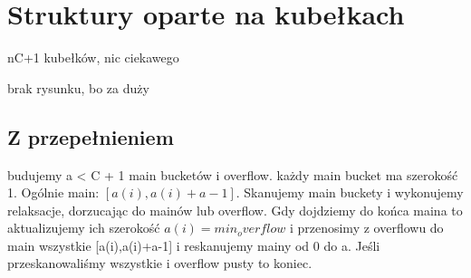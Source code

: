 \section{Struktury oparte na kubełkach}
\label{sec:dijkstraBuckets}

nC+1 kubełków, nic ciekawego

brak rysunku, bo za duży


\subsection{Z przepełnieniem}


budujemy a < C + 1 main bucketów i overflow. każdy main bucket ma szerokość 1. Ogólnie main: $[a(i),a(i)+a-1]$. Skanujemy main buckety i wykonujemy relaksacje, dorzucając do mainów lub overflow. Gdy dojdziemy do końca maina to aktualizujemy ich szerokość $a(i) = min_overflow$ i przenosimy z overflowu do main wszystkie [a(i),a(i)+a-1] i reskanujemy mainy od 0 do a. Jeśli przeskanowaliśmy wszystkie i overflow pusty to koniec.

